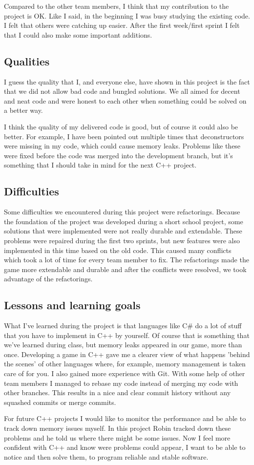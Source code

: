 Compared to the other team members, I think that my contribution to the project is OK. Like I said, in the beginning I was busy studying the existing code. I felt that others were catching up easier. After the first week/first sprint I felt that I could also make some important additions.

\subsection{Qualities}
I guess the quality that I, and everyone else, have shown in this project is the fact that we did not allow bad code and bungled solutions. We all aimed for decent and neat code and were honest to each other when something could be solved on a better way.

I think the quality of my delivered code is good, but of course it could also be better. For example, I have been pointed out multiple times that deconstructors were missing in my code, which could cause memory leaks. Problems like these were fixed before the code was merged into the development branch, but it's something that I should take in mind for the next C++ project.

\subsection{Difficulties}
Some difficulties we encountered during this project were refactorings. Because the foundation of the project was developed during a short school project, some solutions that were implemented were not really durable and extendable. These problems were repaired during the first two sprints, but new features were also implemented in this time based on the old code. This caused many conflicts which took a lot of time for every team member to fix. The refactorings made the game more extendable and durable and after the conflicts were resolved, we took advantage of the refactorings.

\subsection{Lessons and learning goals}		
What I've learned during the project is that languages like C\# do a lot of stuff that you have to implement in C++ by yourself. Of course that is something that we've learned during class, but memory leaks appeared in our game, more than once. 
Developing a game in C++ gave me a clearer view of what happens 'behind the scenes' of other languages where, for example, memory management is taken care of for you.
I also gained more experience with Git. With some help of other team members I managed to rebase my code instead of merging my code with other branches. This results in a nice and clear commit history without any squashed commits or merge commits.

For future C++ projects I would like to monitor the performance and be able to track down memory issues myself. In this project Robin tracked down these problems and he told us where there might be some issues. Now I feel more confident with C++ and know were problems could appear, I want to be able to notice and then solve them, to program reliable and stable software. 

